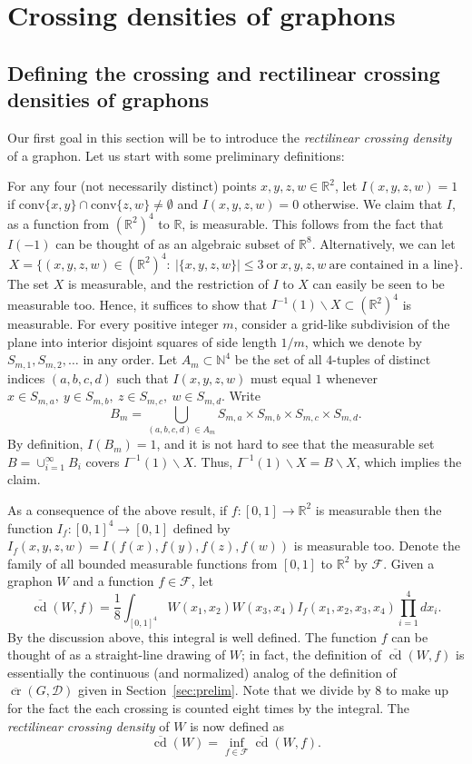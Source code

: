 \documentclass{article}
\begin{document}
\section{Crossing densities of graphons}\label{sec:graphons}


\subsection{Defining the crossing and rectilinear crossing densities of graphons}\label{sec:densities} Our first goal in this section will be to introduce the \textit{rectilinear crossing density} of a graphon.  Let us start with some preliminary definitions:

For any four (not necessarily distinct) points $x,y,z,w\in\mathbb{R}^2$, let $I(x,y,z,w)=1$ if $\text{conv}\{x,y\}\cap\text{conv}\{z,w\}\neq\emptyset$ and $I(x,y,z,w)=0$ otherwise. We claim that $I$, as a function from $(\mathbb{R}^2)^4$ to $\mathbb{R}$, is measurable. This follows from the fact that $I(-1)$ can be thought of as an algebraic subset of $\mathbb R^8$. Alternatively, we can let \[X=\{(x,y,z,w)\in(\mathbb{R}^2)^4 :\ |\{x,y,z,w\}|\leq 3\ \text{or}\ x,y,z,w\ \text{are contained in a line}\}.\] The set $X$ is measurable, and the restriction of $I$ to $X$ can easily be seen to be measurable too. Hence, it suffices to show that $I^{-1}(1)\backslash X\subset(\mathbb{R}^2)^4$ is measurable. For every positive integer $m$, consider a grid-like subdivision of the plane into interior disjoint squares of side length $1/m$, which we denote by $S_{m,1},S_{m,2},\dots$ in any order. Let $A_m\subset\mathbb{N}^4$ be the set of all $4$-tuples of distinct indices $(a,b,c,d)$ such that $I(x,y,z,w)$ must equal $1$ whenever $x\in S_{m,a},\ y\in S_{m,b},\ z\in S_{m,c},\ w\in S_{m,d}$. Write \[B_m=\bigcup_{(a,b,c,d)\in A_m}S_{m,a}\times S_{m,b}\times S_{m,c}\times S_{m,d}.\] By definition, $I(B_m)=1$, and it is not hard to see that the measurable set $B=\cup_{i=1}^\infty B_i$ covers $I^{-1}(1)\backslash X$. Thus, $I^{-1}(1)\backslash X=B\backslash X$, which implies the claim.

As a consequence of the above result, if $f:[0,1]\rightarrow\mathbb{R}^2$ is measurable then the function $I_f:[0,1]^4\rightarrow[0,1]$ defined by $I_f(x,y,z,w)=I(f(x),f(y),f(z),f(w))$ is measurable too. Denote the family of all bounded measurable functions from $[0,1]$ to $\mathbb{R}^2$ by $\mathcal{F}$. Given a graphon $W$ and a function $f\in\mathcal{F}$, let \[\overline{\mathop{\mathrm{cd}}}(W,f)=\frac{1}{8}\int_{[0,1]^4}W(x_1,x_2)W(x_3,x_4)I_f(x_1,x_2,x_3,x_4)\prod_{i=1}^4 dx_i.\]
By the discussion above, this integral is well defined. The function $f$ can be thought of as a straight-line drawing of $W$; in fact, the definition of $\overline{\mathop{\mathrm{cd}}}(W,f)$ is essentially the continuous (and normalized) analog of the definition of $\overline{\mathop{\mathrm{cr}}}(G,\mathcal{D})$ given in Section~\ref{sec:prelim}. Note that we divide by $8$ to make up for the fact the each crossing is counted eight times by the integral. The \textit{rectilinear crossing density} of $W$ is now defined as \[\overline{\mathop{\mathrm{cd}}}(W)=\inf_{f\in\mathcal{F}}\overline{\mathop{\mathrm{cd}}}(W,f).\] 
\end{document}
